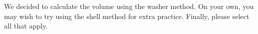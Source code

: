 \documentclass{ximera}
\begin{document}
\begin{exercise}
\begin{exercise}
\begin{exercise}
			We decided to calculate the volume using the washer method. On your own, you may wish to try using the shell method for extra practice. Finally, please select all that apply.
			\begin{selectAll}
			  \end{selectAll}
			
		\end{exercise}
	\end{exercise}
\end{exercise}
\end{document}
